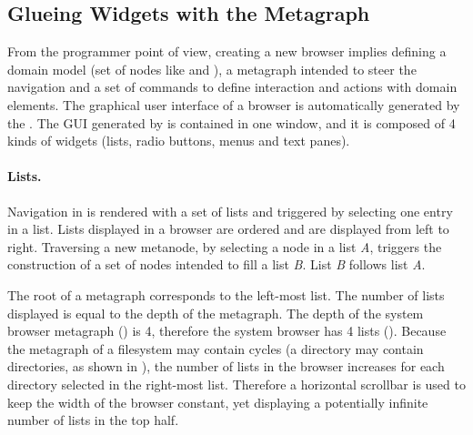 \documentclass[a4paper,10pt,twoside]{book}
\begin{document}
\subsection{Glueing Widgets with the Metagraph}\label{widgets}
From the programmer point of view, creating a new browser implies defining a domain model (set of nodes like  and ), a metagraph intended to steer the navigation and a set of commands to define interaction and actions with domain elements. The graphical user interface of a browser is automatically generated by the \obf. The GUI generated by \obf is contained in one window, and it is composed of 4 kinds of widgets (lists, radio buttons, menus and text panes).



\paragraph{Lists.} Navigation in \obf is rendered with a set of lists and triggered by selecting one entry in a list. Lists displayed in a browser are ordered and are displayed from left to right. Traversing a new metanode, by selecting a node in a list \textit{A}, triggers the construction of a set of nodes intended to fill a list \textit{B}. List \textit{B} follows list \textit{A}.

The root of a metagraph corresponds to the left-most list. The number of lists displayed is equal to the depth of the metagraph. The depth of the system browser metagraph () is 4, therefore the system browser has 4 lists (). Because the metagraph of a filesystem may contain cycles (\ie a directory may contain directories, as shown in ), the number of lists in the browser increases for each directory selected in the right-most list. Therefore a horizontal scrollbar is used to keep the width of the browser constant, yet displaying a potentially infinite number of lists in the top half.
\end{document}
